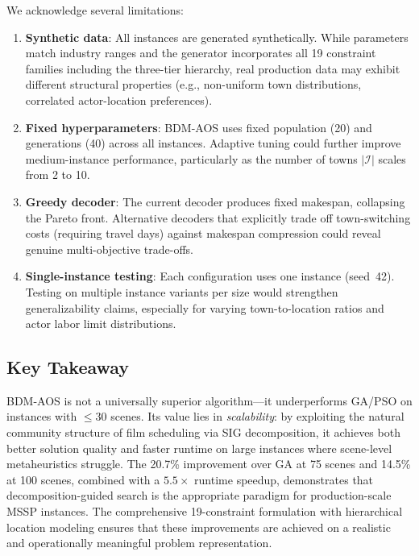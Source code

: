 We acknowledge several limitations:
\begin{enumerate}
    \item \textbf{Synthetic data}: All instances are generated synthetically. While parameters match industry ranges and the generator incorporates all 19 constraint families including the three-tier hierarchy, real production data may exhibit different structural properties (e.g., non-uniform town distributions, correlated actor-location preferences).
    \item \textbf{Fixed hyperparameters}: BDM-AOS uses fixed population (20) and generations (40) across all instances. Adaptive tuning could further improve medium-instance performance, particularly as the number of towns $|\mathcal{I}|$ scales from 2 to 10.
    \item \textbf{Greedy decoder}: The current decoder produces fixed makespan, collapsing the Pareto front. Alternative decoders that explicitly trade off town-switching costs (requiring travel days) against makespan compression could reveal genuine multi-objective trade-offs.
    \item \textbf{Single-instance testing}: Each configuration uses one instance (seed~42). Testing on multiple instance variants per size would strengthen generalizability claims, especially for varying town-to-location ratios and actor labor limit distributions.
\end{enumerate}

\subsection{Key Takeaway}

BDM-AOS is not a universally superior algorithm---it underperforms GA/PSO on instances with $\leq 30$ scenes.
Its value lies in \emph{scalability}: by exploiting the natural community structure of film scheduling via SIG decomposition, it achieves both better solution quality and faster runtime on large instances where scene-level metaheuristics struggle.
The 20.7\% improvement over GA at 75 scenes and 14.5\% at 100 scenes, combined with a $5.5\times$ runtime speedup, demonstrates that decomposition-guided search is the appropriate paradigm for production-scale MSSP instances.
The comprehensive 19-constraint formulation with hierarchical location modeling ensures that these improvements are achieved on a realistic and operationally meaningful problem representation.
